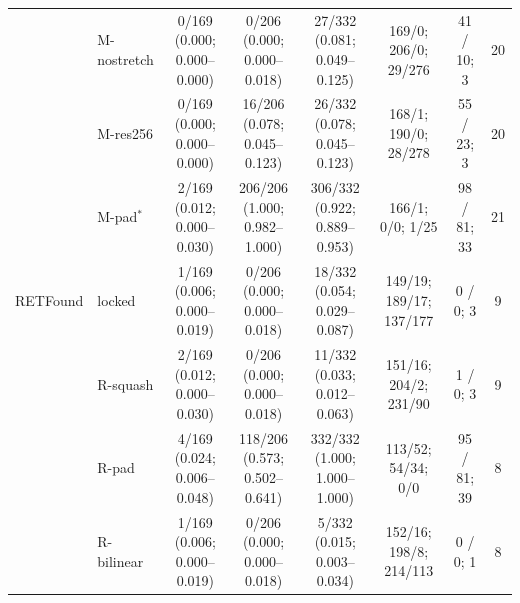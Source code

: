 \begin{longtable}{@{}llcccccc@{}}
 & M-nostretch & \makecell{0/169\\{\scriptsize (0.000; 0.000--0.000)}} & \makecell{0/206\\{\scriptsize (0.000; 0.000--0.018)}} & \makecell{27/332\\{\scriptsize (0.081; 0.049--0.125)}} & 169/0; 206/0; 29/276 & 41 / 10; 3 & 20 \\
 & M-res256 & \makecell{0/169\\{\scriptsize (0.000; 0.000--0.000)}} & \makecell{16/206\\{\scriptsize (0.078; 0.045--0.123)}} & \makecell{26/332\\{\scriptsize (0.078; 0.045--0.123)}} & 168/1; 190/0; 28/278 & 55 / 23; 3 & 20 \\
 & M-pad$^{*}$ & \makecell{2/169\\{\scriptsize (0.012; 0.000--0.030)}} & \makecell{206/206\\{\scriptsize (1.000; 0.982--1.000)}} & \makecell{306/332\\{\scriptsize (0.922; 0.889--0.953)}} & 166/1; 0/0; 1/25 & 98 / 81; 33 & 21 \\
\addlinespace[2pt]
RETFound & locked & \makecell{1/169\\{\scriptsize (0.006; 0.000--0.019)}} & \makecell{0/206\\{\scriptsize (0.000; 0.000--0.018)}} & \makecell{18/332\\{\scriptsize (0.054; 0.029--0.087)}} & 149/19; 189/17; 137/177 & 0 / 0; 3 & 9 \\
 & R-squash & \makecell{2/169\\{\scriptsize (0.012; 0.000--0.030)}} & \makecell{0/206\\{\scriptsize (0.000; 0.000--0.018)}} & \makecell{11/332\\{\scriptsize (0.033; 0.012--0.063)}} & 151/16; 204/2; 231/90 & 1 / 0; 3 & 9 \\
 & R-pad & \makecell{4/169\\{\scriptsize (0.024; 0.006--0.048)}} & \makecell{118/206\\{\scriptsize (0.573; 0.502--0.641)}} & \makecell{332/332\\{\scriptsize (1.000; 1.000--1.000)}} & 113/52; 54/34; 0/0 & 95 / 81; 39 & 8 \\
 & R-bilinear & \makecell{1/169\\{\scriptsize (0.006; 0.000--0.019)}} & \makecell{0/206\\{\scriptsize (0.000; 0.000--0.018)}} & \makecell{5/332\\{\scriptsize (0.015; 0.003--0.034)}} & 152/16; 198/8; 214/113 & 0 / 0; 1 & 8 \\

\end{longtable}

